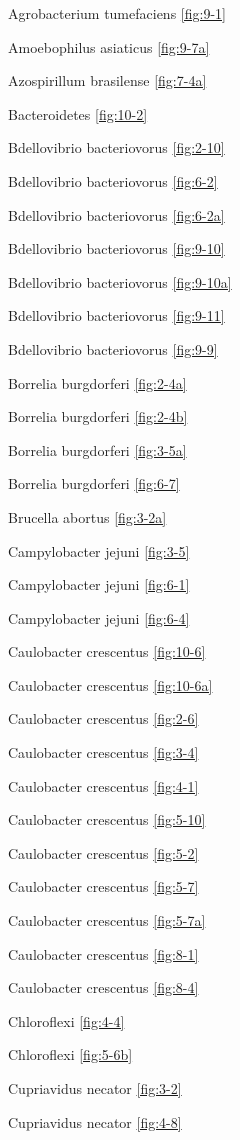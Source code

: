 \documentclass[]{tufte-book}
\begin{document}
Agrobacterium tumefaciens \ref{fig:9-1}

Amoebophilus asiaticus \ref{fig:9-7a}

Azospirillum brasilense \ref{fig:7-4a}

Bacteroidetes \ref{fig:10-2}

Bdellovibrio bacteriovorus \ref{fig:2-10}

Bdellovibrio bacteriovorus \ref{fig:6-2}

Bdellovibrio bacteriovorus \ref{fig:6-2a}

Bdellovibrio bacteriovorus \ref{fig:9-10}

Bdellovibrio bacteriovorus \ref{fig:9-10a}

Bdellovibrio bacteriovorus \ref{fig:9-11}

Bdellovibrio bacteriovorus \ref{fig:9-9}

Borrelia burgdorferi \ref{fig:2-4a}

Borrelia burgdorferi \ref{fig:2-4b}

Borrelia burgdorferi \ref{fig:3-5a}

Borrelia burgdorferi \ref{fig:6-7}

Brucella abortus \ref{fig:3-2a}

Campylobacter jejuni \ref{fig:3-5}

Campylobacter jejuni \ref{fig:6-1}

Campylobacter jejuni \ref{fig:6-4}

Caulobacter crescentus \ref{fig:10-6}

Caulobacter crescentus \ref{fig:10-6a}

Caulobacter crescentus \ref{fig:2-6}

Caulobacter crescentus \ref{fig:3-4}

Caulobacter crescentus \ref{fig:4-1}

Caulobacter crescentus \ref{fig:5-10}

Caulobacter crescentus \ref{fig:5-2}

Caulobacter crescentus \ref{fig:5-7}

Caulobacter crescentus \ref{fig:5-7a}

Caulobacter crescentus \ref{fig:8-1}

Caulobacter crescentus \ref{fig:8-4}

Chloroflexi \ref{fig:4-4}

Chloroflexi \ref{fig:5-6b}

Cupriavidus necator \ref{fig:3-2}

Cupriavidus necator \ref{fig:4-8}
\end{document}
